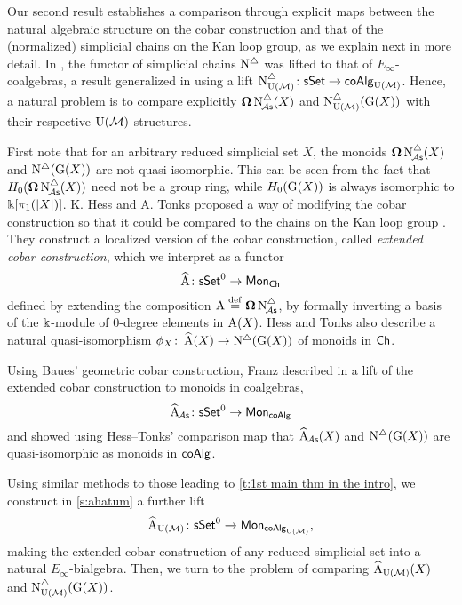 Our second result establishes a comparison through explicit maps between the natural algebraic structure on the cobar construction and that of the (normalized) simplicial chains on the Kan loop group, as we explain next in more detail.
In \cite{mcclure2003multivariable, berger2004combinatorial}, the functor of simplicial chains $\operatorname{N^{\triangle}}$ was lifted to that of $E_{\infty}$-coalgebras, a result generalized in \cite{medina2020prop1} using a lift $\operatorname{N^{\triangle}_{{\operatorname{U}(\mathcal{M})}}} \colon \mathsf{sSet} \to \mathsf{coAlg}_{{\operatorname{U}(\mathcal{M})}}$.
Hence, a natural problem is to compare explicitly $\operatorname{\mathbf{\Omega}} \operatorname{N^{\triangle}_{\!{\mathcal{A}\mathsf{s}}}}(X)$ and $\operatorname{N^{\triangle}_{{\operatorname{U}(\mathcal{M})}}}(\operatorname{G}(X))$ with their respective ${\operatorname{U}(\mathcal{M})}$-structures.

First note that for an arbitrary reduced simplicial set $X$, the monoids $\operatorname{\mathbf{\Omega}} \operatorname{N^{\triangle}_{\!{\mathcal{A}\mathsf{s}}}}(X)$ and $\operatorname{N^{\triangle}}(\operatorname{G}(X))$ are not quasi-isomorphic.
This can be seen from the fact that $H_0(\operatorname{\mathbf{\Omega}} \operatorname{N^{\triangle}_{\!{\mathcal{A}\mathsf{s}}}}(X))$ need not be a group ring, while $H_0(\operatorname{G}(X))$ is always isomorphic to $ \Bbbk[\pi_1(|X|)]$.
K. Hess and A. Tonks proposed a way of modifying the cobar construction so that it could be compared to the chains on the Kan loop group \cite{hess2010cobar}.
They construct a localized version of the cobar construction, called \textit{extended cobar construction}, which we interpret as a functor
\[
\operatorname{\widehat{A}} \colon \mathsf{sSet}^0 \to \mathsf{Mon}_{\mathsf{Ch}}
\]
defined by extending the composition $\operatorname{A} \stackrel{\mathrm{def}}{=} \operatorname{\mathbf{\Omega}} \operatorname{N^{\triangle}_{\!{\mathcal{A}\mathsf{s}}}}$, by formally inverting a basis of the $\Bbbk$-module of $0$-degree elements in $\operatorname{A}(X)$.
Hess and Tonks also describe a natural quasi-isomorphism $\phi_X \colon \operatorname{\widehat{A}}(X) \to \operatorname{N^{\triangle}}(\operatorname{G}(X))$ of monoids in $\mathsf{Ch}$.

Using Baues’ geometric cobar construction, Franz described in \cite{franz2020szczarba} a lift of the extended cobar construction to monoids in coalgebras,
\[
\operatorname{\widehat{A}}_{\!{\mathcal{A}\mathsf{s}}} \colon \mathsf{sSet}^0 \to \mathsf{Mon}_{\mathsf{coAlg}}
\]
and showed using Hess--Tonks' comparison map that $\operatorname{\widehat{A}_{\!{\mathcal{A}\mathsf{s}}}}(X)$ and $\operatorname{N^{\triangle}}(\operatorname{G}(X))$ are quasi-isomorphic as monoids in $\mathsf{coAlg}$.

Using similar methods to those leading to \cref{t:1st main thm in the intro}, we construct in \cref{s:ahatum} a further lift
\[
\operatorname{\widehat{A}_{{\operatorname{U}(\mathcal{M})}}} \colon \mathsf{sSet}^0 \to \mathsf{Mon}_{\mathsf{coAlg}_{\operatorname{U}(\mathcal{M})}},
\]
making the extended cobar construction of any reduced simplicial set into a natural $E_\infty$-bialgebra.
Then, we turn to the problem of comparing $\operatorname{\widehat{A}_{{\operatorname{U}(\mathcal{M})}}}(X)$ and $\operatorname{N^{\triangle}_{{\operatorname{U}(\mathcal{M})}}}(\operatorname{G}(X))$.

